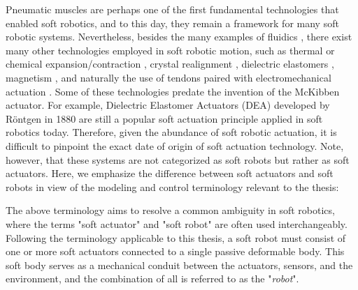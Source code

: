 Pneumatic muscles are perhaps one of the first fundamental technologies that enabled soft robotics, and to this day, they remain a framework for many soft robotic systems. Nevertheless, besides the many examples of fluidics \cite{Marchese2014, Marchese2016, Katzschmann2018, Suzumori1991, Mosadegh2014}, there exist many other technologies employed in soft robotic motion, such as thermal \cite{Wu2021Dec} or chemical expansion/contraction \cite{Tolley2014, Bartlett2015, Wehner2016}, crystal realignment \cite{Pilz2020, Lopez2018, Vantomme2021, Polygerinos2013}, dielectric elastomers \cite{Keplinger2011}, magnetism \cite{Roh2019Apr, KimYoonho2018, McDonald2020, Boyvat2017Jul}, and naturally the use of tendons paired with electromechanical actuation \cite{Renda2018, Bern2019, Kim2020Jun, Coevoet2017Feb, Wang2016Sep}. Some of these technologies predate the invention of the McKibben actuator. For example, Dielectric Elastomer Actuators (DEA) developed by R\"{o}ntgen in 1880 \cite{Rontgen1880} are still a popular soft actuation principle applied in soft robotics today. Therefore, given the abundance of soft robotic actuation, it is difficult to pinpoint the exact date of origin of soft actuation technology. Note, however, that these systems are not categorized as soft robots but rather as soft actuators. Here, we emphasize the difference between soft actuators and soft robots in view of the modeling and control terminology relevant to the thesis:
%
%
\begin{rmk} The above terminology aims to resolve a common ambiguity in soft robotics, where the terms "soft actuator" and "soft robot" are often used interchangeably. Following the terminology applicable to this thesis, a soft robot must consist of one or more soft actuators connected to a single passive deformable body. This soft body serves as a mechanical conduit between the actuators, sensors, and the environment, and the combination of all is referred to as the "\emph{robot}". 
\end{rmk}
\vspace{-3mm}
